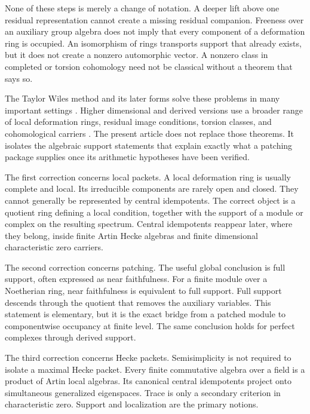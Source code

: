 \documentclass[11pt]{amsart}
\theoremstyle{definition}
\theoremstyle{remark}
\begin{document}
None of these steps is merely a change of notation. A deeper lift above one residual representation cannot create a missing residual companion. Freeness over an auxiliary group algebra does not imply that every component of a deformation ring is occupied. An isomorphism of rings transports support that already exists, but it does not create a nonzero automorphic vector. A nonzero class in completed or torsion cohomology need not be classical without a theorem that says so.

The Taylor Wiles method and its later forms solve these problems in many important settings \cite{Wiles1995,TaylorWiles1995,Diamond1997,Kisin2009,Gee2022}. Higher dimensional and derived versions use a broader range of local deformation rings, residual image conditions, torsion classes, and cohomological carriers \cite{ClozelHarrisTaylor2008,BarnetLambGeeGeraghtyTaylor2014,CalegariGeraghty2018,Thorne2012,MiagkovThorne2023,Scholze2015,CaraianiScholze2017,NewtonThorne2016}. The present article does not replace those theorems. It isolates the algebraic support statements that explain exactly what a patching package supplies once its arithmetic hypotheses have been verified.

The first correction concerns local packets. A local deformation ring is usually complete and local. Its irreducible components are rarely open and closed. They cannot generally be represented by central idempotents. The correct object is a quotient ring defining a local condition, together with the support of a module or complex on the resulting spectrum. Central idempotents reappear later, where they belong, inside finite Artin Hecke algebras and finite dimensional characteristic zero carriers.

The second correction concerns patching. The useful global conclusion is full support, often expressed as near faithfulness. For a finite module over a Noetherian ring, near faithfulness is equivalent to full support. Full support descends through the quotient that removes the auxiliary variables. This statement is elementary, but it is the exact bridge from a patched module to componentwise occupancy at finite level. The same conclusion holds for perfect complexes through derived support.

The third correction concerns Hecke packets. Semisimplicity is not required to isolate a maximal Hecke packet. Every finite commutative algebra over a field is a product of Artin local algebras. Its canonical central idempotents project onto simultaneous generalized eigenspaces. Trace is only a secondary criterion in characteristic zero. Support and localization are the primary notions.
\end{document}
